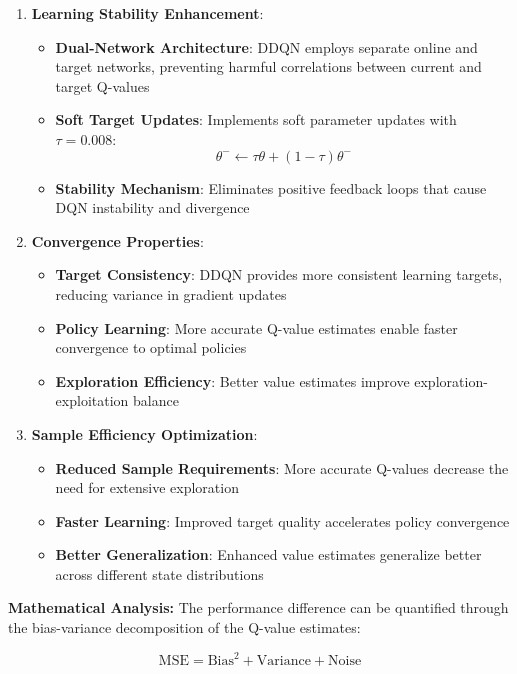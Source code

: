 \documentclass[12pt]{article}
\begin{document}
{{{\begin{enumerate}
    \item \textbf{Learning Stability Enhancement}:
    \begin{itemize}
        \item \textbf{Dual-Network Architecture}: DDQN employs separate online and target networks, preventing harmful correlations between current and target Q-values
        \item \textbf{Soft Target Updates}: Implements soft parameter updates with $\tau = 0.008$:
        $$\theta^- \leftarrow \tau \theta + (1-\tau) \theta^-$$
        \item \textbf{Stability Mechanism}: Eliminates positive feedback loops that cause DQN instability and divergence
    \end{itemize}
    
    \item \textbf{Convergence Properties}:
    \begin{itemize}
        \item \textbf{Target Consistency}: DDQN provides more consistent learning targets, reducing variance in gradient updates
        \item \textbf{Policy Learning}: More accurate Q-value estimates enable faster convergence to optimal policies
        \item \textbf{Exploration Efficiency}: Better value estimates improve exploration-exploitation balance
    \end{itemize}
    
    \item \textbf{Sample Efficiency Optimization}:
    \begin{itemize}
        \item \textbf{Reduced Sample Requirements}: More accurate Q-values decrease the need for extensive exploration
        \item \textbf{Faster Learning}: Improved target quality accelerates policy convergence
        \item \textbf{Better Generalization}: Enhanced value estimates generalize better across different state distributions
    \end{itemize}
\end{enumerate}

\textbf{Mathematical Analysis:}
The performance difference can be quantified through the bias-variance decomposition of the Q-value estimates:

$$\text{MSE} = \text{Bias}^2 + \text{Variance} + \text{Noise}$$

}}}
\end{document}

